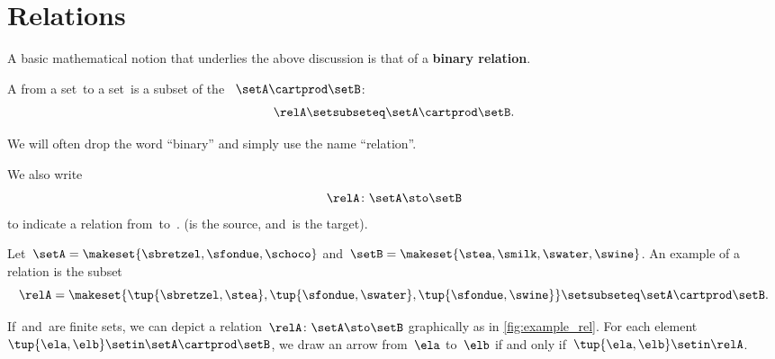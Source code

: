
\section{Relations}
\label{sec:connection-relations}

A basic mathematical notion that underlies the above discussion is that of a \textbf{binary relation}.

\begin{ctdefinition}
    \label{def:binary-relation}
    A  \relA from a set~\setA to a set~\setB is a subset of the ~$\setA\cartprod \setB$:
    \begin{equation}
        \relA \setsubseteq \setA \cartprod \setB.
    \end{equation}
\end{ctdefinition}

We will often drop the word ``binary'' and simply use the name ``relation''.

We also write
\begin{equation}
    \relA \colon \setA \sto \setB
\end{equation}
to indicate a relation from~\setA to~\setB.
(\setA is the source, and~\setB is the target).

\begin{marginfigure}
    \centering
    \caption{Relation of \cref{exa:simple-rel}.}
    \label{fig:example_rel}
\end{marginfigure}

\begin{example}
    \label{exa:simple-rel}
    Let~$\setA = \makeset{ \sbretzel, \sfondue, \schoco}$ and~$\setB = \makeset{ \stea, \smilk, \swater, \swine }$.
    An example of a relation is the subset
    \begin{equation}
        \relA = \makeset{ \tup{\sbretzel, \stea}, \tup{\sfondue, \swater}, \tup{\sfondue, \swine} } \setsubseteq \setA \cartprod \setB.
    \end{equation}
\end{example}

If~\setA and~\setB are finite sets, we can depict a relation~$\relA \colon \setA \sto \setB$ graphically as in \cref{fig:example_rel}.
For each element~$\tup{\ela,\elb} \setin \setA \cartprod \setB$, we draw an arrow from~$\ela$ to~$\elb$ if and only if~$\tup{\ela,\elb} \setin \relA$.

